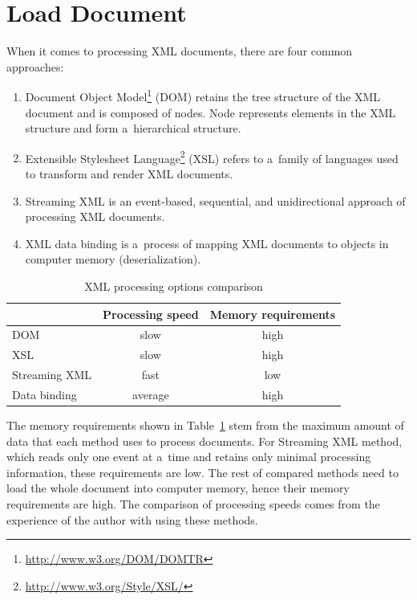 \documentclass[11pt,oneside,final]{fithesis2}
\begin{document}
\section{Load Document}
\label{section:loaddocument}
When it comes to processing XML documents, there are four common approaches:

\begin{enumerate}
\item Document Object Model\footnote{\url{http://www.w3.org/DOM/DOMTR}} (DOM) retains the tree structure of the XML document and is composed of nodes. Node represents elements in the XML structure and form a~hierarchical structure.

\item Extensible Stylesheet Language\footnote{\url{http://www.w3.org/Style/XSL/}} (XSL) refers to a~family of languages used to transform and render XML documents. 

\item Streaming XML is an event-based, sequential, and unidirectional approach of processing XML documents.

\item XML data binding is a~process of mapping XML documents to objects in computer memory (deserialization).
\end{enumerate}

\begin{table}[!ht]
\centering
\begin{tabular}{|l|c|c|}
\hline
& Processing speed & Memory requirements \\ \hline
\hline
DOM & slow & high  \\ \hline
XSL & slow & high  \\ \hline
Streaming XML & fast & low  \\ \hline
Data binding & average & high  \\ \hline
\end{tabular}
\caption{XML processing options comparison}
\label{table:xmlprocessing}
\end{table}

The memory requirements shown in Table~\ref{table:xmlprocessing} stem from the maximum amount of data that each method uses to process documents. For Streaming XML method, which reads only one event at a~time and retains only minimal processing information, these requirements are low. The rest of compared methods need to load the whole document into computer memory, hence their memory requirements are high. The comparison of processing speeds comes from the experience of the author with using these methods.
\end{document}
